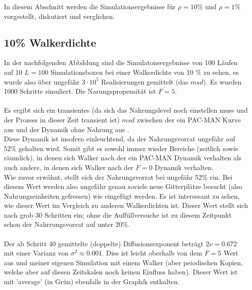 \documentclass[a4paper, 12pt]{report}
\begin{document}
In diesem Abschnitt werden die Simulationsergebnisse für $\rho = 10\%$ und $\rho=1\%$ vorgestellt, diskutiert und verglichen.

\subsection{10\% Walkerdichte}

In der nachfolgenden Abbildung sind die Simulatonsergebnisse von 100 Läufen auf 10 $L=100$ Simulationsboxen bei einer Walkerdichte von 10 \% zu sehen, es wurde also über ungefähr $3\cdot 10^5$ Realisierungen gemittelt (das $msd$). Es wurden 1000 Schritte simuliert. Die Narungspropensität ist $F=5$.
\\
\\
Es ergibt sich ein transientes (da sich das Nahrungslevel noch einstellen muss und der Prozess in dieser Zeit transient ist) $msd$ zwischen der ein PAC-MAN Kurve aus \cite{doi:10.1063/1.4999485} und der Dynamik ohne Nahrung aus \cite{PhysRevLett.50.77}.
\\
Diese Dynamik ist insofern einleuchtend, da der Nahrungsvorrat ungefähr auf 52\% gehalten wird. Somit gibt es sowohl immer wieder Bereiche (zeitlich sowie räumlich), in denen sich Walker nach der ein PAC-MAN Dynamik verhalten als auch andere, in denen sich Walker nach der $F=0$ Dynamik verhalten.
\\
Wie zuvor erwähnt, stellt sich der Nahrungsvorrat bei ungefähr 52\% ein. Bei diesem Wert werden also ungefähr genau soviele neue Gitterplätze besucht (also Nahrungseinheiten gefressen) wie eingefügt werden. Es ist interessant zu sehen, wie dieser Wert im Vergleich zu anderen Walkerdichten ist. Dieser Wert stellt sich nach grob 30 Schritten ein; ohne die Auffüllversuche ist zu diesem Zeitpunkt schon der Nahrrungsvorrat auf unter 20\%. 
\\
\\
Der ab Schritt 40 gemittelte (doppelte) Diffusionsexponent beträgt $2\nu = 0.672$ mit einer Varianz von $\sigma^2 \approx 0.001$. Dies ist leicht oberhalb von dem $F=5$ Wert aus \cite{doi:10.1063/1.4999485} und meiner eigenen Simulation mit einem Walker (aber peiodischen Kopien, welche aber auf diesen Zeitskalen noch keinen Einfluss haben). Dieser Wert ist mit 'average' (in Grün) ebenfalls in der Graphik enthalten.
\end{document}

